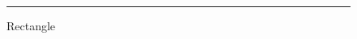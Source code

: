 \documentclass[uplatex,dvipdfmx]{jlreq}
\begin{document}
\lipsum[1-2]
  \begin{figure}[h]
    \centering
    \rule{8cm}{6cm}
    \caption{Rectangle}
  \end{figure}
\end{document}
